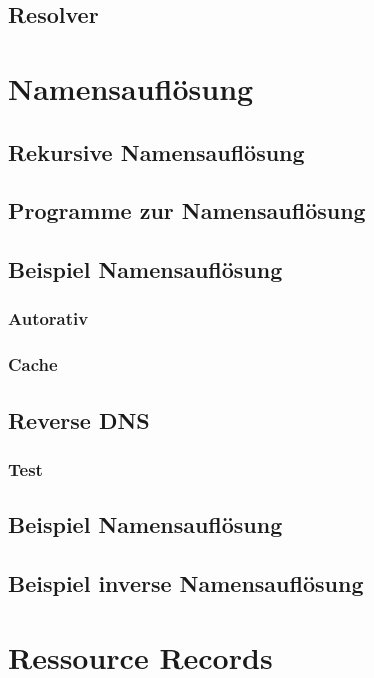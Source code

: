\subsection{Resolver}

\section{Namensauflösung}
\subsection{Rekursive Namensauflösung}
\subsection{Programme zur Namensauflösung}
\subsection{Beispiel Namensauflösung}
\subsubsection{Autorativ}
\subsubsection{Cache}
\subsection{Reverse DNS}
\subsubsection*{Test}
\subsection{Beispiel Namensauflösung}
\subsection{Beispiel inverse Namensauflösung}

\section{Ressource Records}
